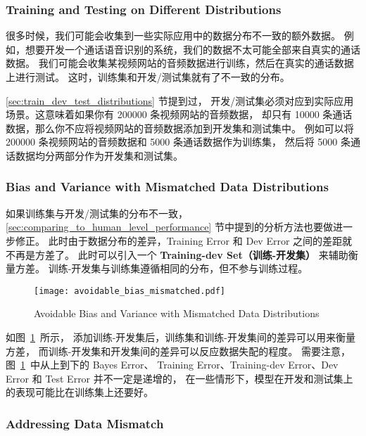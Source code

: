 \subsubsection{Training and Testing on Different Distributions}

很多时候，我们可能会收集到一些实际应用中的数据分布不一致的额外数据。
例如，想要开发一个通话语音识别的系统，我们的数据不太可能全部来自真实的通话数据。
我们可能会收集某视频网站的音频数据进行训练，然后在真实的通话数据上进行测试。
这时，训练集和开发/测试集就有了不一致的分布。

\ref{sec:train_dev_test_distributions} 节提到过，
开发/测试集必须对应到实际应用场景。这意味着如果你有 200000 条视频网站的音频数据，
却只有 10000 条通话数据，那么你不应将视频网站的音频数据添加到开发集和测试集中。
例如可以将 200000 条视频网站的音频数据和 5000 条通话数据作为训练集，
然后将 5000 条通话数据均分两部分作为开发集和测试集。

\subsubsection{Bias and Variance with Mismatched Data Distributions}

如果训练集与开发/测试集的分布不一致，
\ref{sec:comparing_to_human_level_performance} 节中提到的分析方法也要做进一步修正。
此时由于数据分布的差异，Training Error 和 Dev Error 之间的差距就不再是方差了。
此时可以引入一个 \textbf{Training-dev Set（训练-开发集）} 来辅助衡量方差。
训练-开发集与训练集遵循相同的分布，但不参与训练过程。

\begin{figure}[h!bt]
    \centering
    \texttt{[image: avoidable\_bias\_mismatched.pdf]}
    \caption{Avoidable Bias and Variance with Mismatched Data Distributions}
    \label{fig:avoidable_bias_mismatched}
\end{figure}

如图~\ref{fig:avoidable_bias_mismatched}~所示，
添加训练-开发集后，训练集和训练-开发集间的差异可以用来衡量方差，
而训练-开发集和开发集间的差异可以反应数据失配的程度。
需要注意，图~\ref{fig:avoidable_bias_mismatched}~中从上到下的 Bayes Error、
Training Error、Training-dev Error、Dev Error 和 Test Error 并不一定是递增的，
在一些情形下，模型在开发和测试集上的表现可能比在训练集上还要好。

\subsubsection{Addressing Data Mismatch}

